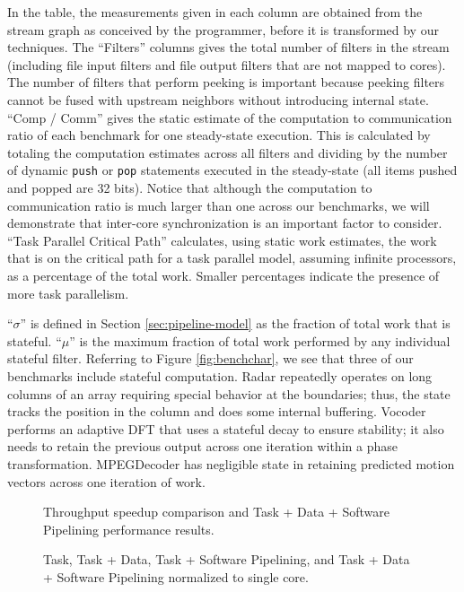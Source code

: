 In the table, the measurements given in each column are obtained from
the stream graph as conceived by the programmer, before it is
transformed by our techniques.  The ``Filters'' columns gives the
total number of filters in the stream (including file input filters
and file output filters that are not mapped to cores).  The number of
filters that perform peeking is important because peeking filters
cannot be fused with upstream neighbors without introducing internal
state. ``Comp / Comm'' gives the static estimate of the computation to
communication ratio of each benchmark for one steady-state
execution. This is calculated by totaling the computation estimates
across all filters and dividing by the number of dynamic {\tt push} or
{\tt pop} statements executed in the steady-state (all items pushed
and popped are 32 bits). Notice that although the computation to
communication ratio is much larger than one across our benchmarks, we
will demonstrate that inter-core synchronization is an important
factor to consider. ``Task Parallel Critical Path'' calculates, using
static work estimates, the work that is on the critical path for a
task parallel model, assuming infinite processors, as a percentage of
the total work.  Smaller percentages indicate the presence of more task
parallelism.

``$\sigma$'' is defined in Section \ref{sec:pipeline-model} as the
fraction of total work that is stateful.  ``$\mu$'' is the maximum
fraction of total work performed by any individual stateful
filter. Referring to Figure \ref{fig:benchchar}, we see that three of
our benchmarks include stateful computation.  Radar repeatedly
operates on long columns of an array requiring special behavior at the
boundaries; thus, the state tracks the position in the column and does
some internal buffering.  Vocoder performs an adaptive DFT that uses a
stateful decay to ensure stability; it also needs to retain the
previous output across one iteration within a phase transformation.
MPEGDecoder has negligible state in retaining predicted motion vectors
across one iteration of work.

\begin{figure*}[t]
\centering
{}
\caption{Throughput speedup comparison and Task + Data + Software Pipelining performance results.
\protect\label{fig:thruput}}
\vspace{6pt}
\end{figure*}

\begin{figure*}[t]
\centering
{}
\caption{Task, Task + Data, Task + Software Pipelining, and Task + Data + Software Pipelining
normalized to single core.
\protect\label{fig:main_comp}}
\vspace{6pt}
\end{figure*}

